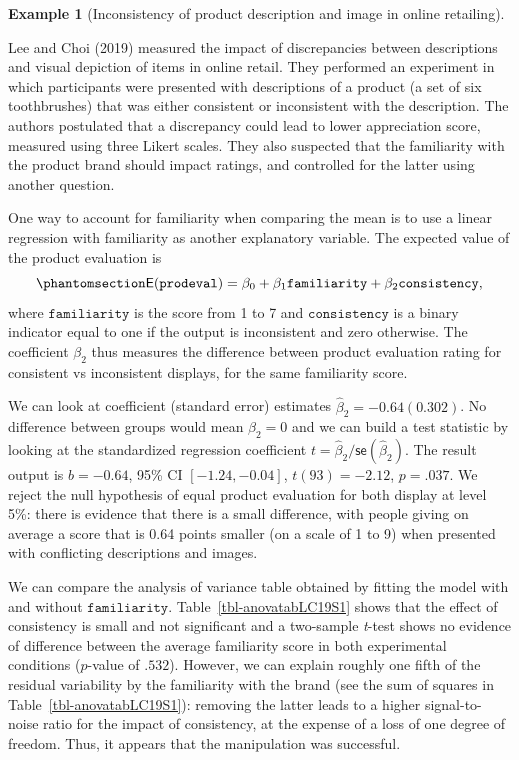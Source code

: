 \documentclass[
  11pt,
  letterpaper,
]{scrbook}
\theoremstyle{definition}
\theoremstyle{definition}
\newtheorem{example}{Example}[chapter]
\theoremstyle{remark}
\begin{document}
\begin{example}[Inconsistency of product description and image in online
retailing]\protect\hypertarget{exm-leechoi}{}\label{exm-leechoi}

Lee and Choi (2019) measured the impact of discrepancies between
descriptions and visual depiction of items in online retail. They
performed an experiment in which participants were presented with
descriptions of a product (a set of six toothbrushes) that was either
consistent or inconsistent with the description. The authors postulated
that a discrepancy could lead to lower appreciation score, measured
using three Likert scales. They also suspected that the familiarity with
the product brand should impact ratings, and controlled for the latter
using another question.

One way to account for familiarity when comparing the mean is to use a
linear regression with familiarity as another explanatory variable. The
expected value of the product evaluation is
\begin{equation}\phantomsection\label{eq-vS}{
\mathsf{E}(\texttt{prodeval}) = \beta_0 + \beta_1 \texttt{familiarity} + \beta_2 \texttt{consistency}, 
}\end{equation} where \(\texttt{familiarity}\) is the score from 1 to 7
and \(\texttt{consistency}\) is a binary indicator equal to one if the
output is inconsistent and zero otherwise. The coefficient \(\beta_2\)
thus measures the difference between product evaluation rating for
consistent vs inconsistent displays, for the same familiarity score.

We can look at coefficient (standard error) estimates
\(\widehat{\beta}_2 = -0.64 (0.302)\). No difference between groups
would mean \(\beta_2=0\) and we can build a test statistic by looking at
the standardized regression coefficient
\(t = \widehat{\beta}_2/\mathsf{se}(\widehat{\beta}_2)\). The result
output is \(b = -0.64\), 95\% CI \([-1.24, -0.04]\), \(t(93) = -2.12\),
\(p = .037\). We reject the null hypothesis of equal product evaluation
for both display at level 5\%: there is evidence that there is a small
difference, with people giving on average a score that is 0.64 points
smaller (on a scale of 1 to 9) when presented with conflicting
descriptions and images.

We can compare the analysis of variance table obtained by fitting the
model with and without \(\texttt{familiarity}\).
Table~\ref{tbl-anovatabLC19S1} shows that the effect of consistency is
small and not significant and a two-sample \emph{t}-test shows no
evidence of difference between the average familiarity score in both
experimental conditions (\(p\)-value of \(.532\)). However, we can
explain roughly one fifth of the residual variability by the familiarity
with the brand (see the sum of squares in
Table~\ref{tbl-anovatabLC19S1}): removing the latter leads to a higher
signal-to-noise ratio for the impact of consistency, at the expense of a
loss of one degree of freedom. Thus, it appears that the manipulation
was successful.


\end{example}
\end{document}
